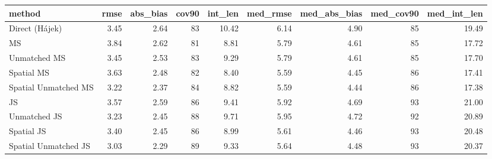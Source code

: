 
\begin{tabular}{lrrrrrrrr}
\toprule
method & rmse & abs\_bias & cov90 & int\_len & med\_rmse & med\_abs\_bias & med\_cov90 & med\_int\_len\\
\midrule
Direct (Hájek) & 3.45 & 2.64 & 83 & 10.42 & 6.14 & 4.90 & 85 & 19.49\\
MS & 3.84 & 2.62 & 81 & 8.81 & 5.79 & 4.61 & 85 & 17.72\\
Unmatched MS & 3.45 & 2.53 & 83 & 9.29 & 5.79 & 4.61 & 85 & 17.70\\
Spatial MS & 3.63 & 2.48 & 82 & 8.40 & 5.59 & 4.45 & 86 & 17.41\\
Spatial Unmatched MS & 3.22 & 2.37 & 84 & 8.82 & 5.59 & 4.44 & 86 & 17.38\\
JS & 3.57 & 2.59 & 86 & 9.41 & 5.92 & 4.69 & 93 & 21.00\\
Unmatched JS & 3.23 & 2.45 & 88 & 9.71 & 5.95 & 4.72 & 92 & 20.89\\
Spatial JS & 3.40 & 2.45 & 86 & 8.99 & 5.61 & 4.46 & 93 & 20.48\\
Spatial Unmatched JS & 3.03 & 2.29 & 89 & 9.33 & 5.64 & 4.48 & 93 & 20.37\\
\bottomrule
\end{tabular}
